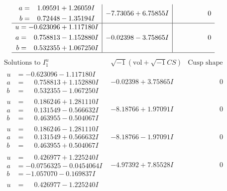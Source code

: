 \documentclass[1p]{elsarticle_modified}
\theoremstyle{definition}
\newcommand{\I}{\sqrt{-1}}
\begin{document}
$$\begin{array}{c|c|c}
\begin{aligned}
a &= \phantom{-}1.09591 + 1.26059 I \\
b &= \phantom{-}0.72448 - 1.35194 I\end{aligned}
 & -7.73056 + 6.75855 I & \phantom{-0.000000 } 0 \\ \hline\begin{aligned}
u &= -0.623096 + 1.117180 I \\
a &= \phantom{-}0.758813 - 1.152880 I \\
b &= \phantom{-}0.532355 + 1.067250 I\end{aligned}
 & -0.02398 - 3.75865 I & \phantom{-0.000000 } 0\\
 \hline 
 \end{array}$$\newpage$$\begin{array}{c|c|c}  
\text{Solutions to }I^u_{1}& \I (\text{vol} + \sqrt{-1}CS) & \text{Cusp shape}\\
 \hline 
\begin{aligned}
u &= -0.623096 - 1.117180 I \\
a &= \phantom{-}0.758813 + 1.152880 I \\
b &= \phantom{-}0.532355 - 1.067250 I\end{aligned}
 & -0.02398 + 3.75865 I & \phantom{-0.000000 } 0 \\ \hline\begin{aligned}
u &= \phantom{-}0.186246 + 1.281110 I \\
a &= \phantom{-}0.131549 - 0.566632 I \\
b &= \phantom{-}0.463955 - 0.504067 I\end{aligned}
 & -8.18766 + 1.97091 I & \phantom{-0.000000 } 0 \\ \hline\begin{aligned}
u &= \phantom{-}0.186246 - 1.281110 I \\
a &= \phantom{-}0.131549 + 0.566632 I \\
b &= \phantom{-}0.463955 + 0.504067 I\end{aligned}
 & -8.18766 - 1.97091 I & \phantom{-0.000000 } 0 \\ \hline\begin{aligned}
u &= \phantom{-}0.426977 + 1.225240 I \\
a &= -0.0756325 - 0.0454064 I \\
b &= -1.057070 - 0.169837 I\end{aligned}
 & -4.97392 + 7.85528 I & \phantom{-0.000000 } 0 \\ \hline\begin{aligned}
u &= \phantom{-}0.426977 - 1.225240 I \\

\end{aligned}
\end{array}$$
\end{document}
